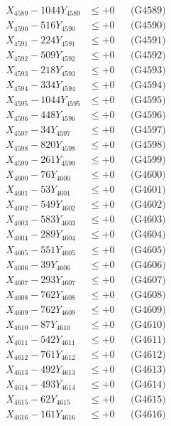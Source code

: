 \documentclass[a4paper,10pt]{article}
\begin{document}
{\begin{align}
X_{4589} - 1044Y_{4589} &\leq +0 && \text{(G4589)} \\
X_{4590} - 516Y_{4590} &\leq +0 && \text{(G4590)} \\
\allowbreak
X_{4591} - 224Y_{4591} &\leq +0 && \text{(G4591)} \\
X_{4592} - 509Y_{4592} &\leq +0 && \text{(G4592)} \\
X_{4593} - 218Y_{4593} &\leq +0 && \text{(G4593)} \\
X_{4594} - 334Y_{4594} &\leq +0 && \text{(G4594)} \\
X_{4595} - 1044Y_{4595} &\leq +0 && \text{(G4595)} \\
X_{4596} - 448Y_{4596} &\leq +0 && \text{(G4596)} \\
X_{4597} - 34Y_{4597} &\leq +0 && \text{(G4597)} \\
X_{4598} - 820Y_{4598} &\leq +0 && \text{(G4598)} \\
X_{4599} - 261Y_{4599} &\leq +0 && \text{(G4599)} \\
X_{4600} - 76Y_{4600} &\leq +0 && \text{(G4600)} \\
\allowbreak
X_{4601} - 53Y_{4601} &\leq +0 && \text{(G4601)} \\
X_{4602} - 549Y_{4602} &\leq +0 && \text{(G4602)} \\
X_{4603} - 583Y_{4603} &\leq +0 && \text{(G4603)} \\
X_{4604} - 289Y_{4604} &\leq +0 && \text{(G4604)} \\
X_{4605} - 551Y_{4605} &\leq +0 && \text{(G4605)} \\
X_{4606} - 39Y_{4606} &\leq +0 && \text{(G4606)} \\
X_{4607} - 293Y_{4607} &\leq +0 && \text{(G4607)} \\
X_{4608} - 762Y_{4608} &\leq +0 && \text{(G4608)} \\
X_{4609} - 762Y_{4609} &\leq +0 && \text{(G4609)} \\
X_{4610} - 87Y_{4610} &\leq +0 && \text{(G4610)} \\
\allowbreak
X_{4611} - 542Y_{4611} &\leq +0 && \text{(G4611)} \\
X_{4612} - 761Y_{4612} &\leq +0 && \text{(G4612)} \\
X_{4613} - 492Y_{4613} &\leq +0 && \text{(G4613)} \\
X_{4614} - 493Y_{4614} &\leq +0 && \text{(G4614)} \\
X_{4615} - 62Y_{4615} &\leq +0 && \text{(G4615)} \\
X_{4616} - 161Y_{4616} &\leq +0 && \text{(G4616)} \\

\end{align}}
\end{document}
